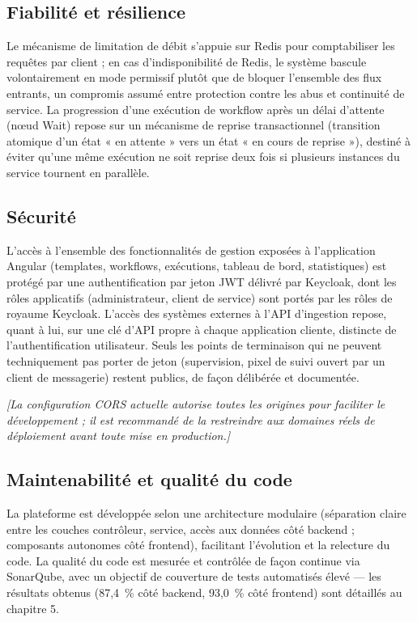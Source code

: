 \documentclass[12pt,a4paper]{report}
\newcommand{\placeholder}[1]{\par\smallskip\noindent\textcolor{placeholderred}{\itshape [#1]}\par\smallskip}
\begin{document}
\subsection{Fiabilité et résilience}

Le mécanisme de limitation de débit s'appuie sur Redis pour comptabiliser les requêtes par client ; en cas d'indisponibilité de Redis, le système bascule volontairement en mode permissif plutôt que de bloquer l'ensemble des flux entrants, un compromis assumé entre protection contre les abus et continuité de service. La progression d'une exécution de workflow après un délai d'attente (n\oe ud Wait) repose sur un mécanisme de reprise transactionnel (transition atomique d'un état « en attente » vers un état « en cours de reprise »), destiné à éviter qu'une même exécution ne soit reprise deux fois si plusieurs instances du service tournent en parallèle.

\subsection{Sécurité}

L'accès à l'ensemble des fonctionnalités de gestion exposées à l'application Angular (templates, workflows, exécutions, tableau de bord, statistiques) est protégé par une authentification par jeton JWT délivré par Keycloak, dont les rôles applicatifs (administrateur, client de service) sont portés par les rôles de royaume Keycloak. L'accès des systèmes externes à l'API d'ingestion repose, quant à lui, sur une clé d'API propre à chaque application cliente, distincte de l'authentification utilisateur. Seuls les points de terminaison qui ne peuvent techniquement pas porter de jeton (supervision, pixel de suivi ouvert par un client de messagerie) restent publics, de façon délibérée et documentée.

\placeholder{La configuration CORS actuelle autorise toutes les origines pour faciliter le développement ; il est recommandé de la restreindre aux domaines réels de déploiement avant toute mise en production.}

\subsection{Maintenabilité et qualité du code}

La plateforme est développée selon une architecture modulaire (séparation claire entre les couches contrôleur, service, accès aux données côté backend ; composants autonomes côté frontend), facilitant l'évolution et la relecture du code. La qualité du code est mesurée et contrôlée de façon continue via SonarQube, avec un objectif de couverture de tests automatisés élevé --- les résultats obtenus (87,4~\% côté backend, 93,0~\% côté frontend) sont détaillés au chapitre 5.
\end{document}
